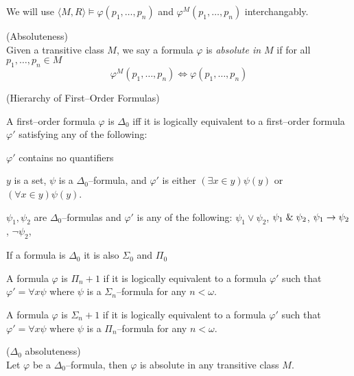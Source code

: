 We will use $\langle M, R \rangle \models \varphi(p_1, \ldots, p_n)$ and $\varphi^M(p_1, \ldots, p_n)$ interchangably.

\begin{definition}{(Absoluteness)}\\
Given a transitive class $M$, we say a formula $\varphi$ is \emph{absolute in $M$} if for all $p_1, \ldots, p_n \in M$
\begin{equation}
\varphi^M(p_1, \ldots, p_n) \iff \varphi(p_1, \ldots, p_n)
\end{equation}
\end{definition}

\begin{definition}{(Hierarchy of First–Order Formulas)}\\
\bce[(I)]
\item A first–order formula $\varphi$ is $\Delta_0$ iff it is logically equivalent to a first–order formula $\varphi'$ satisfying any of the following:
\bce[(i)]
\item $\varphi'$ contains no quantifiers
\item $y$ is a set, $\psi$ is a $\Delta_0$–formula, and $\varphi'$ is either $(\exists x \in y)\psi(y)$ or $(\forall x \in y)\psi(y)$.
\item $\psi_1, \psi_2$ are $\Delta_0$–formulas and $\varphi'$ is any of the following: $\psi_1 \lor \psi_2$, $\psi_1 \mathrel{\&} \psi_2$, $\psi_1 \rightarrow \psi_2$, $\neg \psi_2$, 
\ece
\item If a formula is $\Delta_0$ it is also $\Sigma_0$ and $\Pi_0$
\item A formula $\varphi$ is $\Pi_n+1$ if it is logically equivalent to a formula $\varphi'$ such that $\varphi' = \forall x \psi$ where $\psi$ is a $\Sigma_n$–formula for any $n < \omega$.
\item A formula $\varphi$ is $\Sigma_n+1$ if it is logically equivalent to a formula $\varphi'$ such that $\varphi' = \forall x \psi$ where $\psi$ is a $\Pi_n$–formula for any $n < \omega$.
\ece
\end{definition} %

\begin{lemma}{($\Delta_0$ absoluteness)}\label{lemma:delta_0_absoluteness}\\
Let $\varphi$ be a $\Delta_0$–formula, then $\varphi$ is absolute in any transitive class $M$.
\end{lemma}

